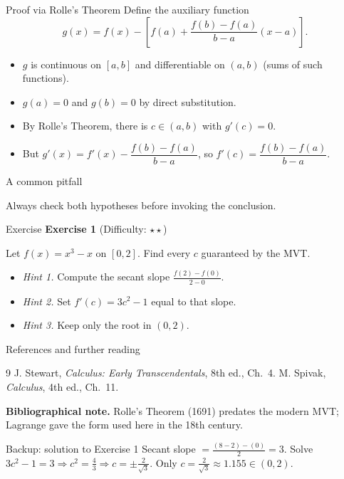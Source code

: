 \documentclass[aspectratio=169,10pt]{beamer}
\begin{document}
\begin{frame}{Proof via Rolle's Theorem}
  Define the auxiliary function
  \[
    g(x) = f(x) - \left[ f(a) + \frac{f(b)-f(a)}{b-a}(x-a) \right].
  \]
  \begin{itemize}
    \item $g$ is continuous on $[a,b]$ and differentiable on $(a,b)$ (sums of such functions).
    \item $g(a)=0$ and $g(b)=0$ by direct substitution.
    \item By Rolle's Theorem, there is $c\in(a,b)$ with $g'(c)=0$.
    \item But $g'(x)=f'(x)-\dfrac{f(b)-f(a)}{b-a}$, so $f'(c)=\dfrac{f(b)-f(a)}{b-a}$. \qedhere
  \end{itemize}
\end{frame}

\begin{frame}{A common pitfall}

  Always check both hypotheses before invoking the conclusion.
\end{frame}


\begin{frame}{Exercise}
  \textbf{Exercise 1} \hfill (Difficulty: $\star\star$)

  Let $f(x)=x^3-x$ on $[0,2]$. Find every $c$ guaranteed by the MVT.
  \begin{itemize}
    \item \emph{Hint 1.} Compute the secant slope $\frac{f(2)-f(0)}{2-0}$.
    \item \emph{Hint 2.} Set $f'(c)=3c^2-1$ equal to that slope.
    \item \emph{Hint 3.} Keep only the root in $(0,2)$.
  \end{itemize}
\end{frame}


\begin{frame}{References and further reading}
  \begin{thebibliography}{9}
     J. Stewart, \emph{Calculus: Early Transcendentals}, 8th ed., Ch.~4.
     M. Spivak, \emph{Calculus}, 4th ed., Ch.~11.
  \end{thebibliography}

  \textbf{Bibliographical note.} Rolle's Theorem (1691) predates the modern MVT;
  Lagrange gave the form used here in the 18th century.
\end{frame}

\appendix

\begin{frame}{Backup: solution to Exercise 1}
  Secant slope $=\frac{(8-2)-(0)}{2}=3$. Solve $3c^2-1=3 \Rightarrow c^2=\tfrac{4}{3}
  \Rightarrow c=\pm\tfrac{2}{\sqrt3}$. Only $c=\tfrac{2}{\sqrt3}\approx 1.155\in(0,2)$.
\end{frame}
\end{document}
